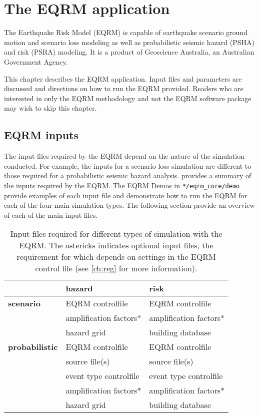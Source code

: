 \chapter{The EQRM application}
\label{ch:application}

The Earthquake Risk Model (EQRM) is capable of earthquake scenario
ground motion and scenario loss modeling as well as probabilistic
seismic hazard (PSHA) and risk (PSRA) modeling. It is a product of
Geoscience Australia, an Australian Government Agency.

This chapter describes the EQRM application. Input files and
parameters are discussed and directions on how to run the EQRM
provided. Readers who are interested in only the EQRM methodology
and not the EQRM software package may wish to skip this chapter.

\section{EQRM inputs}

The input files required by the EQRM depend on the nature of the
simulation conducted. For example, the inputs for a scenario loss
simulation are different to those required for a probabilistic
seismic hazard analysis.  provides a
summary of the inputs required by the EQRM. The EQRM Demos in
\texttt{*/eqrm\_core/demo} provide examples of each input file and
demonstrate how to run the EQRM for each of the four main simulation
types. The following section provide an overview of each of the main
input files.

\begin{table}
\caption{Input files required for different types of simulation with
the EQRM. The astericks indicates optional input files, the
requirement for which depends on settings in the EQRM control file
(see \cref{ch:reg} for more information).}
\label{tab:input-overview} \centering
\begin{tabular}{|l|l|l|}
\hline
 & \textbf{hazard} & \textbf{risk} \\
\hline
\textbf{scenario} & EQRM controlfile & EQRM controlfile \\
  & amplification factors* & amplification factors* \\
  & hazard grid & building database \\
\hline
\textbf{probabilistic} & EQRM controlfile & EQRM controlfile\\
  & source file(s) & source file(s) \\
  & event type controlfile & event type controlfile \\
  & amplification factors* & amplification factors* \\
  & hazard grid & building database \\
\hline
\end{tabular}
\end{table}

